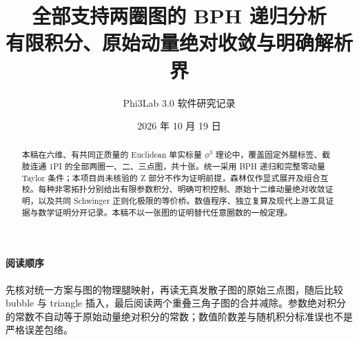 \documentclass[UTF8,a4paper,11pt,fontset=fandol]{ctexart}
\title{全部支持两圈图的 BPH 递归分析\\\large 有限积分、原始动量绝对收敛与明确解析界}
\author{Phi3Lab 3.0 软件研究记录}
\date{2026 年 10 月 19 日}
\begin{document}
\maketitle
\begin{abstract}
本稿在六维、有共同正质量的 Euclidean 单实标量 $\phi^3$ 理论中，覆盖固定外腿标签、截肢连通 1PI 的全部两圈一、二、三点图，共十张。统一采用 BPH 递归和完整零动量 Taylor 条件；本项目尚未核验的 Z 部分不作为证明前提，森林仅作显式展开及组合互校。每种非零拓扑分别给出有限参数积分、明确可积控制、原始十二维动量绝对收敛证明，以及共同 Schwinger 正则化极限的等价桥。数值程序、独立复算及现代上游工具证据与数学证明分开记录。本稿不以一张图的证明替代任意圈数的一般定理。
\end{abstract}
\paragraph{阅读顺序}
先核对统一方案与图的物理腿映射，再读无真发散子图的原始三点图，随后比较 bubble 与 triangle 插入，最后阅读两个重叠三角子图的合并减除。参数绝对积分的常数不自动等于原始动量绝对积分的常数；数值阶数差与随机积分标准误也不是严格误差包络。
\tableofcontents
\clearpage

\clearpage

\clearpage

\clearpage


\clearpage

\clearpage

\end{document}
